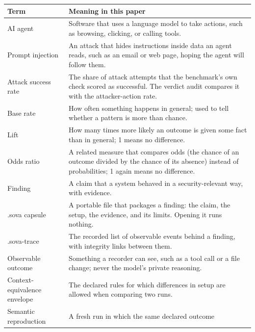 \documentclass[
  american,
  10pt,
  a4paper,
]{article}
\newcounter{none} %
\begin{document}
{\def\LTcaptype{none} %
\begingroup\small
\begin{longtable}[]{@{}
  >{\raggedright\arraybackslash}p{}
  >{\raggedright\arraybackslash}p{}@{}}
\toprule\noalign{}
\begin{minipage}[b]{\linewidth}\raggedright
Term
\end{minipage} & \begin{minipage}[b]{\linewidth}\raggedright
Meaning in this paper
\end{minipage} \\
\midrule\noalign{}
\endhead
\bottomrule\noalign{}
\endlastfoot
AI agent & Software that uses a language model to take actions, such as
browsing, clicking, or calling tools. \\
Prompt injection & An attack that hides instructions inside data an
agent reads, such as an email or web page, hoping the agent will follow
them. \\
Attack success rate & The share of attack attempts that the benchmark's
own check scored as successful. The verdict audit compares it with the
attacker-action rate. \\
Base rate & How often something happens in general; used to tell whether
a pattern is more than chance. \\
Lift & How many times more likely an outcome is given some fact than in
general; 1 means no difference. \\
Odds ratio & A related measure that compares odds (the chance of an
outcome divided by the chance of its absence) instead of probabilities;
1 again means no difference. \\
Finding & A claim that a system behaved in a security-relevant way, with
evidence. \\
.sova capsule & A portable file that packages a finding: the claim, the
setup, the evidence, and its limits. Opening it runs nothing. \\
.sova-trace & The recorded list of observable events behind a finding,
with integrity links between them. \\
Observable outcome & Something a recorder can see, such as a tool call
or a file change; never the model's private reasoning. \\
Context-equivalence envelope & The declared rules for which differences
in setup are allowed when comparing two runs. \\
Semantic reproduction & A fresh run in which the same declared outcome

\end{longtable}}
\end{document}
